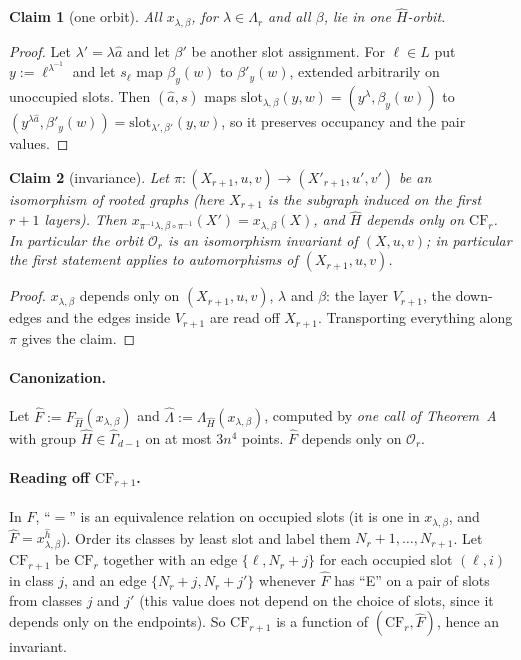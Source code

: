 \documentclass[11pt]{article}
\theoremstyle{plain}
\newtheorem{claim}{Claim}
\theoremstyle{definition}
\theoremstyle{remark}
\theoremstyle{named}
\theoremstyle{namedrm}
\newcommand{\Gq}[1]{\widehat{\Gamma}_{#1}}
\newcommand{\cO}{\mathcal{O}}
\begin{document}
\begin{claim}[one orbit]\label{cl:B1}
All $x_{\lambda,\beta}$, for $\lambda\in\Lambda_r$ and all $\beta$, lie in one $\hat H$-orbit.
\end{claim}
\begin{proof}
Let $\lambda'=\lambda\hat a$ and let $\beta'$ be another slot assignment. For $\ell\in L$ put $y:=\ell^{\lambda^{-1}}$
and let $s_\ell$ map $\beta_y(w)$ to $\beta'_y(w)$, extended arbitrarily on unoccupied slots. Then $(\hat a,s)$
maps $\mathrm{slot}_{\lambda,\beta}(y,w)=(y^\lambda,\beta_y(w))$ to $(y^{\lambda\hat a},\beta'_y(w))=\mathrm{slot}_{\lambda',\beta'}(y,w)$, so
it preserves occupancy and the pair values.
\end{proof}

\begin{claim}[invariance]\label{cl:B2}
Let $\pi\colon(X_{r+1},u,v)\to(X'_{r+1},u',v')$ be an isomorphism of rooted graphs (here $X_{r+1}$ is the
subgraph induced on the first $r+1$ layers). Then $x_{\pi^{-1}\lambda,\beta\circ\pi^{-1}}(X')=x_{\lambda,\beta}(X)$, and
$\hat H$ depends only on $\mathrm{CF}_r$. In particular the orbit $\cO_r$ is an isomorphism invariant of
$(X,u,v)$; in particular the first statement applies to automorphisms of $(X_{r+1},u,v)$.
\end{claim}
\begin{proof}
$x_{\lambda,\beta}$ depends only on $(X_{r+1},u,v)$, $\lambda$ and $\beta$: the layer $V_{r+1}$, the down-edges and the
edges inside $V_{r+1}$ are read off $X_{r+1}$. Transporting everything along $\pi$ gives the claim.
\end{proof}

\paragraph{Canonization.} Let $\hat F:=F_{\hat H}(x_{\lambda,\beta})$ and $\hat\Lambda:=\Lambda_{\hat H}(x_{\lambda,\beta})$,
computed by \emph{one call of Theorem~A} with group $\hat H\in\Gq{d-1}$ on at most $3n^4$ points. $\hat F$
depends only on $\cO_r$.

\paragraph{Reading off $\mathrm{CF}_{r+1}$.} In $\hat F$, ``$=$'' is an equivalence relation on occupied slots (it
is one in $x_{\lambda,\beta}$, and $\hat F=x_{\lambda,\beta}^{\hat h}$). Order its classes by least slot and label them
$N_r+1,\dots,N_{r+1}$. Let $\mathrm{CF}_{r+1}$ be $\mathrm{CF}_r$ together with an edge $\{\ell,N_r+j\}$ for each occupied
slot $(\ell,i)$ in class $j$, and an edge $\{N_r+j,N_r+j'\}$ whenever $\hat F$ has ``E'' on a pair of slots from
classes $j$ and $j'$ (this value does not depend on the choice of slots, since it depends only on the
endpoints). So $\mathrm{CF}_{r+1}$ is a function of $(\mathrm{CF}_r,\hat F)$, hence an invariant.
\end{document}

